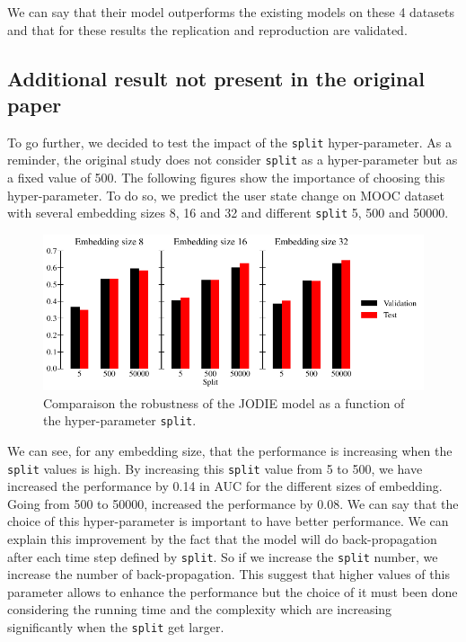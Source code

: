 We can say that their model outperforms the existing models on these 4 datasets and that for these results the replication and reproduction are validated.

\subsection*{Additional result not present in the original paper}

To go further, we decided to test the impact of the \texttt{split} hyper-parameter. As a reminder, the original study does not consider \texttt{split} as a hyper-parameter but as a fixed value of 500. The following figures show the importance of choosing this hyper-parameter. To do so, we predict the user state change on MOOC dataset with several embedding sizes 8, 16 and 32 and different \texttt{split} 5, 500 and 50000.

\begin{figure}[H]
    \centering
    \includegraphics[width = \textwidth]{image/split.pdf}
    \caption{Comparaison the robustness of the JODIE model as a function of the hyper-parameter \texttt{split}.}
    \label{fig:foobar}
\end{figure}

We can see, for any embedding size, that the performance is increasing when the \texttt{split} values is high. By increasing this \texttt{split} value from 5 to 500, we have increased the performance by 0.14 in AUC for the different sizes of embedding. Going from 500 to 50000, increased the performance by 0.08. We can say that the choice of this hyper-parameter is important to have better performance. We can explain this improvement by the fact that the model will do back-propagation after each time step defined by \texttt{split}. So if we increase the \texttt{split} number, we increase the number of back-propagation. This suggest that higher values of this parameter allows to enhance the performance but the choice of it must been done considering the running time and the complexity which are increasing significantly when the \texttt{split} get larger.

